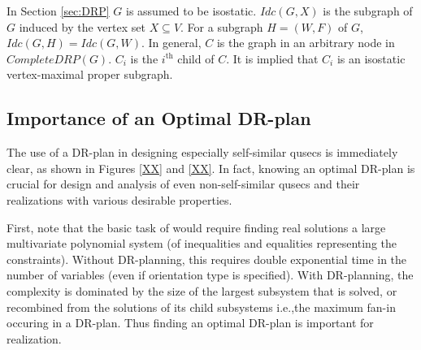 





In Section \ref{sec:DRP} $G$ is assumed to be isostatic.
$Idc(G,X)$ is the subgraph of $G$ induced by the vertex set $X\subseteq V$. 
For a subgraph $H=(W,F)$ of $G$, $Idc(G,H)=Idc(G,W)$.
In general, $C$ is the graph in an arbitrary node in $CompleteDRP(G)$. $C_i$
is the $i^{\text{th}}$ child of $C$. It is implied that 
$C_i$ is an isostatic vertex-maximal proper subgraph.

\subsection*{Importance of an Optimal DR-plan}
The use of a DR-plan in designing especially self-similar qusecs is
immediately clear, as shown in Figures \ref{XX} and \ref{XX}.
In fact, knowing an optimal DR-plan is crucial for design and analysis of 
even non-self-similar qusecs 
and their realizations with various desirable properties. 

First, note that the basic task of  would require finding real
 solutions 
 a large multivariate polynomial system (of inequalities and equalities
 representing the constraints). Without DR-planning, this requires double
 exponential time in the number of variables
 (even if orientation type is specified).
With DR-planning, the complexity is dominated by the size of the largest 
subsystem that is
solved, or recombined from the solutions of its child subsystems i.e.,the maximum fan-in occuring in a DR-plan.
Thus finding an optimal DR-plan is important for realization.

